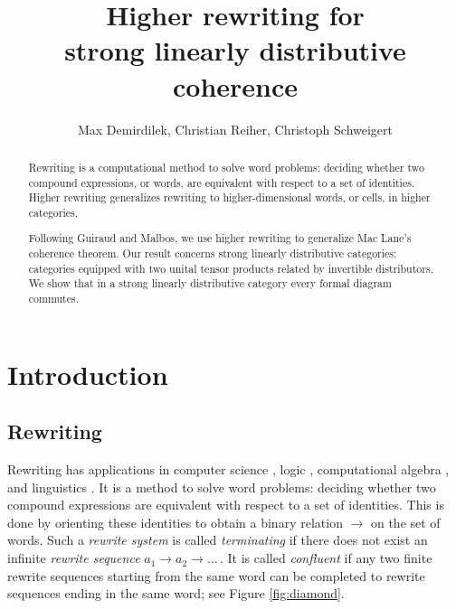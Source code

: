 \documentclass[reqno,12pt]{amsart}
\title[Higher rewriting for strong linearly distributive coherence]{Higher rewriting for\\ strong linearly distributive coherence}
\author{Max Demirdilek, Christian Reiher, Christoph Schweigert}
\begin{document}
\begin{abstract}
	Rewriting is a computational method to solve word problems: deciding whether two compound expressions, or words, are equivalent with respect to a set of identities. Higher rewriting generalizes rewriting to higher-dimensional words, or cells, in higher categories.
	
	Following Guiraud and Malbos, we use higher rewriting to generalize Mac Lane's coherence theorem. Our result concerns strong linearly distributive categories: categories equipped with two unital tensor products related by invertible distributors. We show that in a strong linearly distributive category every formal diagram commutes.
\end{abstract}

\maketitle
\vspace{-0.85cm}
\renewcommand{\baselinestretch}{1.08}\normalsize
\tableofcontents
\renewcommand{\baselinestretch}{1}\normalsize
\vspace{-1.05cm}

\section{Introduction}
\subsection{Rewriting} Rewriting \cite{New42,BaNi98} has applications in computer science \cite{Hs85,DeJ90,RoHa05}, logic \cite{Me12}, computational algebra \cite{KnB70, MaRe98}, and linguistics \cite{Fr98}. It is a method to solve word problems: deciding whether two compound expressions are equivalent with respect to a set of identities. This is done by orienting these identities to obtain a binary relation $\to$ on the set of words. Such a \emph{rewrite system} is called \emph{terminating} if there does not exist an infinite \emph{rewrite sequence} $a_1\to a_2 \to \ldots $\,. It is called \emph{confluent} if any two finite rewrite sequences starting from the same word can be completed to rewrite sequences ending in the same word; see Figure \ref{fig:diamond}.
\end{document}
